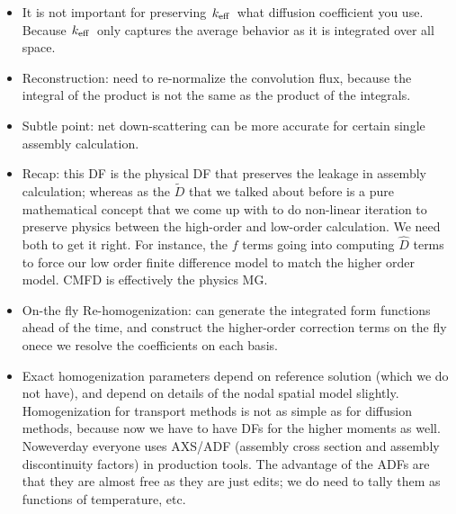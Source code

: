 \documentclass{school-22.211-notes}
\begin{document}
\begin{itemize}
\item It is not important for preserving $\left. k_{\mathrm{eff}} \right.$ what diffusion coefficient you use. Because $\left. k_{\mathrm{eff}} \right.$ only captures the average behavior as it is integrated over all space. 

\item Reconstruction: need to re-normalize the convolution flux, because the integral of the product is not the same as the product of the integrals. 

\item Subtle point: net down-scattering can be more accurate for certain single assembly calculation. 

\item Recap: this DF is the physical DF that preserves the leakage in assembly calculation; whereas as the $\tilde{D}$ that we talked about before is a pure mathematical concept that we come up with to do non-linear iteration to preserve physics between the high-order and low-order calculation. We need both to get it right. For instance, the $f$ terms going into computing $\hat{D}$ terms to force our low order finite difference model to match the higher order model. CMFD is effectively the physics MG. 

\item On-the fly Re-homogenization: can generate the integrated form functions ahead of the time, and construct the higher-order correction terms on the fly onece we resolve the coefficients on each basis. 

\item Exact homogenization parameters depend on reference solution (which we do not have), and depend on details of the nodal spatial model slightly. Homogenization for transport methods is not as simple as for diffusion methods, because now we have to have DFs for the higher moments as well. Noweverday everyone uses AXS/ADF (assembly cross section and assembly discontinuity factors) in production tools. The advantage of the ADFs are that they are almost free as they are just edits; we do need to tally them as functions of temperature, etc. 
\end{itemize}
\end{document}
